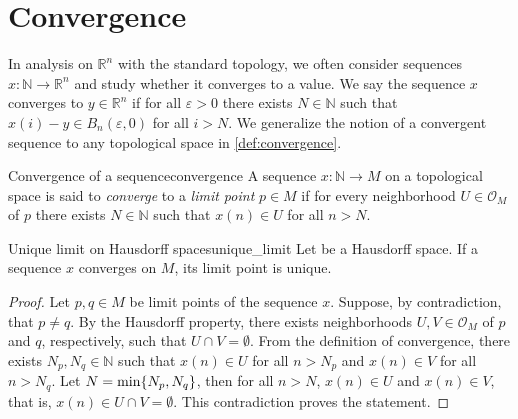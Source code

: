 \section{Convergence}

In analysis on \(\mathbb{R}^n\) with the standard topology, we often consider sequences \(x : \mathbb{N} \to \mathbb{R}^n\) and study whether it converges to a value. We say the sequence \(x\) converges to \(y \in \mathbb{R}^n\) if for all \(\varepsilon > 0\) there exists \(N \in \mathbb{N}\) such that \(x(i) - y \in B_n(\varepsilon, 0)\) for all \(i > N\). We generalize the notion of a convergent sequence to any topological space in \cref{def:convergence}.

\begin{definition}{Convergence of a sequence}{convergence}
    A sequence \(x : \mathbb{N} \to M\) on a topological space  is said to \emph{converge} to a \emph{limit point} \(p \in M\) if for every neighborhood \(U \in \mathcal{O}_M\) of \(p\) there exists \(N \in \mathbb{N}\) such that \(x(n) \in U\) for all \(n > N\).
\end{definition}

\begin{theorem}{Unique limit on Hausdorff spaces}{unique_limit}
    Let  be a Hausdorff space. If a sequence \(x\) converges on \(M\), its limit point is unique.
\end{theorem}
\begin{proof}
    Let \(p, q \in M\) be limit points of the sequence \(x\). Suppose, by contradiction, that \(p \neq q\). By the Hausdorff property, there exists neighborhoods \(U, V \in \mathcal{O}_M\) of \(p\) and \(q\), respectively, such that \(U \cap V = \emptyset\). From the definition of convergence, there exists \(N_p, N_q \in \mathbb{N}\) such that \(x(n) \in U\) for all \(n > N_p\) and \(x(n) \in V\) for all \(n > N_q\). Let \(N = \mathrm{min}\{N_p, N_q\}\), then for all \(n > N\), \(x(n) \in U\) and \(x(n) \in V\), that is, \(x(n) \in U \cap V = \emptyset\). This contradiction proves the statement.
\end{proof}

